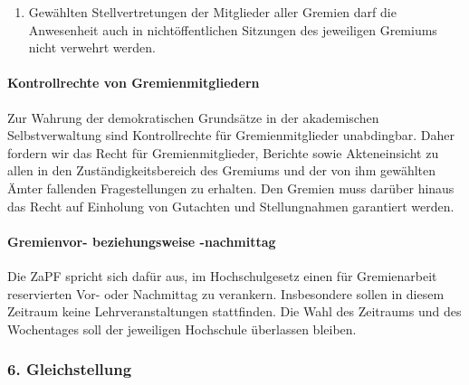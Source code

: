 \documentclass[DIV=calc]{scrartcl}
\begin{document}
\begin{enumerate}
\def\labelenumi{\arabic{enumi})}
\setcounter{enumi}{3}
\item Gewählten Stellvertretungen der Mitglieder aller Gremien darf die Anwesenheit auch in nichtöffentlichen Sitzungen des jeweiligen Gremiums nicht verwehrt werden.
\end{enumerate}

\hypertarget{kontrollrechte-von-gremienmitgliedern}{%
\paragraph{Kontrollrechte von Gremienmitgliedern}\label{kontrollrechte-von-gremienmitgliedern}}

Zur Wahrung der demokratischen Grundsätze in der akademischen Selbstverwaltung sind Kontrollrechte für Gremienmitglieder unabdingbar. Daher fordern wir das Recht für Gremienmitglieder, Berichte sowie Akteneinsicht zu allen in den Zuständigkeitsbereich des Gremiums und der von ihm gewählten Ämter fallenden Fragestellungen zu erhalten. Den Gremien muss darüber hinaus das Recht auf Einholung von Gutachten und Stellungnahmen garantiert werden.

\hypertarget{gremienvor--beziehungsweise--nachmittag}{%
\paragraph{Gremienvor- beziehungsweise -nachmittag}\label{gremienvor--beziehungsweise--nachmittag}}

Die ZaPF spricht sich dafür aus, im Hochschulgesetz einen für
Gremienarbeit reservierten Vor- oder Nachmittag zu verankern.
Insbesondere sollen in diesem Zeitraum keine Lehrveranstaltungen
stattfinden. Die Wahl des Zeitraums und des Wochentages soll der
jeweiligen Hochschule überlassen bleiben.


\hypertarget{gleichstellung}{%
\subsubsection*{6. Gleichstellung}\label{gleichstellung}}
\end{document}
